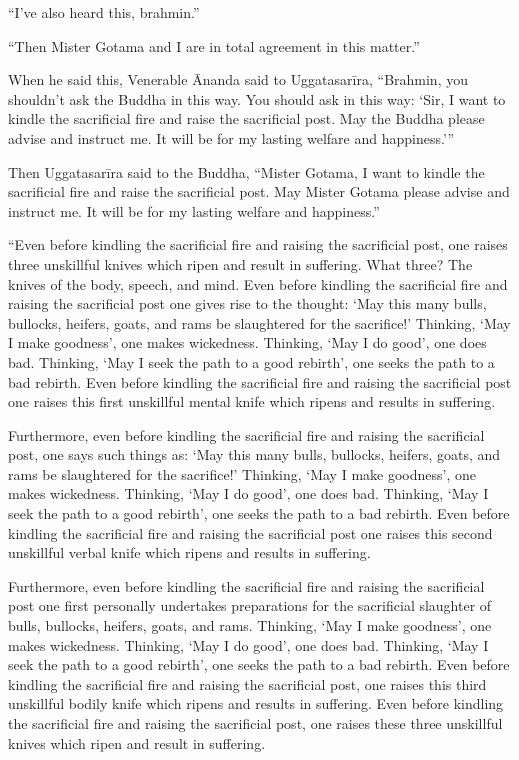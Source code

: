 \documentclass[12pt,openany]{book}%
\begin{document}
“I’ve also heard this, brahmin.” 

“Then Mister Gotama and I are in total agreement in this matter.” 

When he said this, Venerable Ānanda said to \textsanskrit{Uggatasarīra}, “Brahmin, you shouldn’t ask the Buddha in this way. You should ask in this way: ‘Sir, I want to kindle the sacrificial fire and raise the sacrificial post. May the Buddha please advise and instruct me. It will be for my lasting welfare and happiness.’” 

Then \textsanskrit{Uggatasarīra} said to the Buddha, “Mister Gotama, I want to kindle the sacrificial fire and raise the sacrificial post. May Mister Gotama please advise and instruct me. It will be for my lasting welfare and happiness.” 

“Even before kindling the sacrificial fire and raising the sacrificial post, one raises three unskillful knives which ripen and result in suffering. What three? The knives of the body, speech, and mind. Even before kindling the sacrificial fire and raising the sacrificial post one gives rise to the thought: ‘May this many bulls, bullocks, heifers, goats, and rams be slaughtered for the sacrifice!’ Thinking, ‘May I make goodness’, one makes wickedness. Thinking, ‘May I do good’, one does bad. Thinking, ‘May I seek the path to a good rebirth’, one seeks the path to a bad rebirth. Even before kindling the sacrificial fire and raising the sacrificial post one raises this first unskillful mental knife which ripens and results in suffering. 

Furthermore, even before kindling the sacrificial fire and raising the sacrificial post, one says such things as: ‘May this many bulls, bullocks, heifers, goats, and rams be slaughtered for the sacrifice!’ Thinking, ‘May I make goodness’, one makes wickedness. Thinking, ‘May I do good’, one does bad. Thinking, ‘May I seek the path to a good rebirth’, one seeks the path to a bad rebirth. Even before kindling the sacrificial fire and raising the sacrificial post one raises this second unskillful verbal knife which ripens and results in suffering. 

Furthermore, even before kindling the sacrificial fire and raising the sacrificial post one first personally undertakes preparations for the sacrificial slaughter of bulls, bullocks, heifers, goats, and rams. Thinking, ‘May I make goodness’, one makes wickedness. Thinking, ‘May I do good’, one does bad. Thinking, ‘May I seek the path to a good rebirth’, one seeks the path to a bad rebirth. Even before kindling the sacrificial fire and raising the sacrificial post, one raises this third unskillful bodily knife which ripens and results in suffering. Even before kindling the sacrificial fire and raising the sacrificial post, one raises these three unskillful knives which ripen and result in suffering. 
\end{document}

